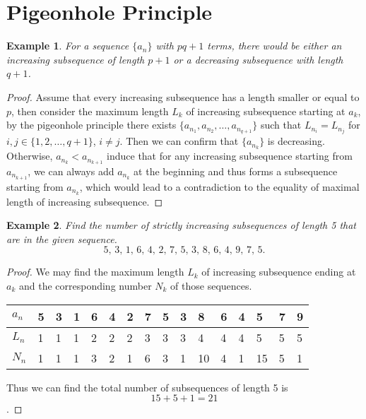 \documentclass{article}
\newtheorem{example}{Example}[section]
\begin{document}
    \newpage
    
    \section{Pigeonhole Principle}
    \begin{example}
        For a sequence $\{a_n\}$ with $pq+1$ terms, there would be either an increasing subsequence of length $p+1$ or a decreasing subsequence with length $q+1$.
    \end{example}
    \begin{proof}
        Assume that every increasing subsequence has a length smaller or equal to $p$, then consider the maximum length $L_k$ of increasing subsequence starting at $a_k$, by the pigeonhole principle there exists $\{a_{n_1}, a_{n_2},\ldots, a_{n_{q+1}}\}$ such that $L_{n_i}=L_{n_j}$ for $i,j\in\{1,2,\ldots,q+1\}$, $i\neq j$. Then we can confirm that $\{a_{n_k}\}$ is decreasing.\\
        
        Otherwise, $a_{n_k}<a_{n_{k+1}}$ induce that for any increasing subsequence starting from $a_{n_{k+1}}$, we can always add $a_{n_k}$ at the beginning and thus forms a subsequence starting from $a_{n_k}$, which would lead to a contradiction to the equality of maximal length of increasing subsequence.
    \end{proof}

    \begin{example}
        Find the number of strictly increasing subsequences of length 5 that are in the given sequence.
        \begin{equation*}
            5,\,3,\,1,\,6,\,4,\,2,\,7,\,5,\,3,\,8,\,6,\,4,\,9,\,7,\,5.
        \end{equation*}
    \end{example}
    \begin{proof}
        We may find the maximum length $L_k$ of increasing subsequence ending at $a_k$ and the corresponding number $N_k$ of those sequences.
        \begin{table}[h!]
            \centering
            \begin{tabular}{|l|l|l|l|l|l|l|l|l|l|l|l|l|l|l|l|}
                \hline
                $a_n$ & 5 & 3 & 1 & 6 & 4 & 2 & 7 & 5 & 3 & 8  & 6 & 4 & 5  & 7 & 9 \\ \hline
                $L_n$ & 1 & 1 & 1 & 2 & 2 & 2 & 3 & 3 & 3 & 4  & 4 & 4 & 5  & 5 & 5 \\ \hline
                $N_n$ & 1 & 1 & 1 & 3 & 2 & 1 & 6 & 3 & 1 & 10 & 4 & 1 & 15 & 5 & 1 \\ \hline
            \end{tabular}
        \end{table}
        Thus we can find the total number of subsequences of length 5 is $$15+5+1=21$$.
    \end{proof}
    
\end{document}
